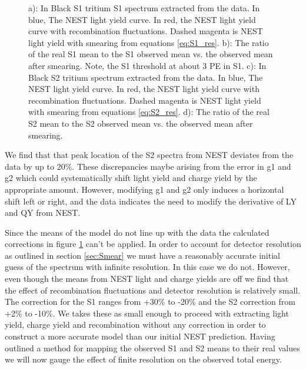 \begin{figure}[h!]
\caption{ a): In Black S1 tritium S1 spectrum extracted from the data. In blue, The NEST light yield curve. In red, the NEST light yield curve with recombination fluctuations. Dashed magenta is NEST light yield with smearing from equations \ref{eq:S1_res}.  b): The ratio of the real S1 mean to the S1 observed mean vs. the observed mean after smearing. Note, the S1 threshold at about 3 PE in S1. c): In Black S2 tritium spectrum extracted from the data. In blue, The NEST light yield curve. In red, the NEST light yield curve with recombination fluctuations. Dashed magenta is NEST light yield with smearing from equations \ref{eq:S2_res}.  d): The ratio of the real S2 mean to the S2 observed mean vs. the observed mean after smearing. }

\label{fig:S1S2_mapping}
\end{figure}
\renewcommand{\baselinestretch}{2}
\small\normalsize


We find that that peak location of the S2 spectra from NEST deviates from the data by up to 20\%. These discrepancies maybe arising from the error  in g1 and g2 which could systematically shift light yield and charge yield by the appropriate amount. However, modifying g1 and g2 only induces a horizontal shift left or right, and the data indicates the need to modify the derivative of LY and QY from NEST.

 
Since the means of the model do not line up with the data the calculated corrections in figure \ref{fig:S1S2_mapping} can't be applied. In order to account for detector resolution as outlined in section \ref{sec:Smear} we must have a reasonably accurate initial guess of the spectrum with infinite resolution. In this case we do not. However, even though the means from NEST light and charge yields are off we find that the effect of recombination fluctuations and detector resolution is relatively small. The correction for the S1 ranges from +30\% to -20\% and the S2 correction from +2\% to -10\%. We takes these as small enough to proceed with extracting light yield, charge yield and recombination without any correction in order to construct a more accurate model than our initial NEST prediction. Having outlined a method for mapping the observed S1 and S2 means to their real values we will now gauge the effect of finite resolution on the observed total energy.  %



